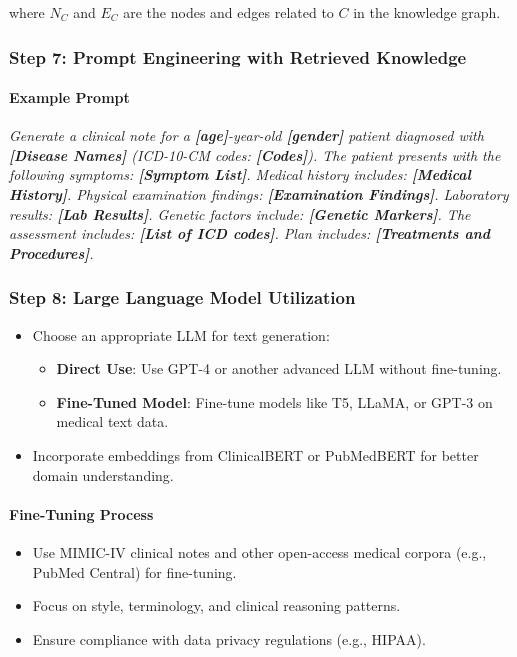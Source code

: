 \documentclass[12pt, a4paper]{article}
\begin{document}
where \( N_C \) and \( E_C \) are the nodes and edges related to \( C \) in the knowledge graph.

\subsubsection{Step 7: Prompt Engineering with Retrieved Knowledge}

\paragraph{Example Prompt}

\textit{Generate a clinical note for a \textbf{[age]}-year-old \textbf{[gender]} patient diagnosed with \textbf{[Disease Names]} (ICD-10-CM codes: \textbf{[Codes]}). The patient presents with the following symptoms: \textbf{[Symptom List]}. Medical history includes: \textbf{[Medical History]}. Physical examination findings: \textbf{[Examination Findings]}. Laboratory results: \textbf{[Lab Results]}. Genetic factors include: \textbf{[Genetic Markers]}. The assessment includes: \textbf{[List of ICD codes]}. Plan includes: \textbf{[Treatments and Procedures]}.}

\subsubsection{Step 8: Large Language Model Utilization}

\begin{itemize}
    \item Choose an appropriate LLM for text generation:
    \begin{itemize}
        \item \textbf{Direct Use}: Use GPT-4 or another advanced LLM without fine-tuning.
        \item \textbf{Fine-Tuned Model}: Fine-tune models like T5, LLaMA, or GPT-3 on medical text data.
    \end{itemize}
    \item Incorporate embeddings from ClinicalBERT or PubMedBERT for better domain understanding.
\end{itemize}

\paragraph{Fine-Tuning Process}

\begin{itemize}
    \item Use MIMIC-IV clinical notes and other open-access medical corpora (e.g., PubMed Central) for fine-tuning.
    \item Focus on style, terminology, and clinical reasoning patterns.
    \item Ensure compliance with data privacy regulations (e.g., HIPAA).
\end{itemize}
\end{document}
